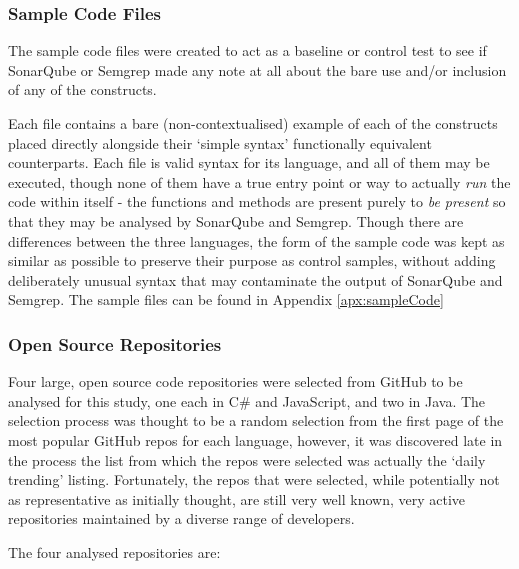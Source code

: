 \documentclass{article}
\begin{document}
        \subsubsection{Sample Code Files}
        \label{subsubsec:sampleFile}
            The sample code files were created to act as a baseline or control test to see if SonarQube or Semgrep made any note at all about the bare use and/or inclusion of any of the constructs.

            Each file contains a bare (non-contextualised) example of each of the constructs placed directly alongside their `simple syntax' functionally equivalent counterparts. Each file is valid syntax for its language, and all of them may be executed, though none of them have a true entry point or way to actually \emph{run} the code within itself - the functions and methods are present purely to \emph{be present} so that they may be analysed by SonarQube and Semgrep. Though there are differences between the three languages, the form of the sample code was kept as similar as possible to preserve their purpose as control samples, without adding deliberately unusual syntax that may contaminate the output of SonarQube and Semgrep. The sample files can be found in Appendix \ref{apx:sampleCode}
        \subsubsection{Open Source Repositories}
            Four large, open source code repositories were selected from GitHub to be analysed for this study, one each in C\# and JavaScript, and two in Java. The selection process was thought to be a random selection from the first page of the most popular GitHub repos for each language, however, it was discovered late in the process the list from which the repos were selected was actually the `daily trending' listing.  Fortunately, the repos that were selected, while potentially not as representative as initially thought, are still very well known, very active repositories maintained by a diverse range of developers.

            The four analysed repositories are:
\end{document}
